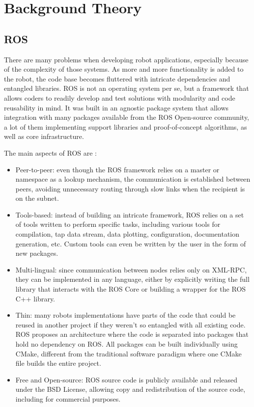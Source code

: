 \chapter{Background Theory}\label{chp:fundament}

\section{ROS}

There are many problems when developing robot applications, especially because of the complexity of those systems. As more and more functionality is added to the robot, the code base becomes fluttered with intricate dependencies and entangled libraries. ROS is not an operating system per se, but a framework that allows coders to readily develop and test solutions with modularity and code reusability in mind. It was built in an agnostic package system that allows integration with many packages available from the ROS Open-source community, a lot of them implementing support libraries and proof-of-concept algorithms, as well as core infrastructure.

The main aspects of ROS are \cite{quigley2009ros}:

\begin{itemize}
\item Peer-to-peer: even though the ROS framework relies on a master or namespace as a lookup mechanism, the communication is established between peers, avoiding unnecessary routing through slow links when the recipient is on the subnet.
\item Tools-based: instead of building an intricate framework, ROS relies on a set of tools written to perform specific tasks, including various tools for compilation, tap data stream, data plotting, configuration, documentation generation, etc. Custom tools can even be written by the user in the form of new packages.
\item Multi-lingual: since communication between nodes relies only on XML-RPC, they can be implemented in any language, either by explicitly writing the full library that interacts with the ROS Core or building a wrapper for the ROS C++ library.
\item Thin: many robots implementations have parts of the code that could be reused in another project if they weren't so entangled with all existing code. ROS proposes an architecture where the code is separated into packages that hold no dependency on ROS. All packages can be built individually using CMake, different from the traditional software paradigm where one CMake file builds the entire project.
\item Free and Open-source: ROS source code is publicly available and released under the BSD License, allowing copy and redistribution of the source code, including for commercial purposes.
\end{itemize}


